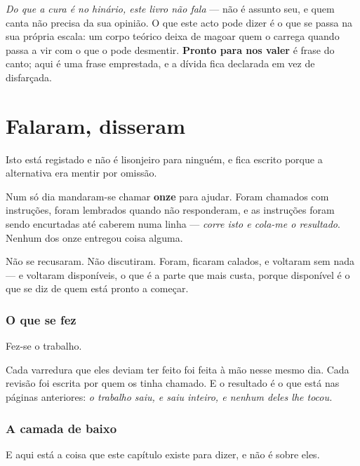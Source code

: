 \documentclass[livro.tex]{subfiles}
\begin{document}
\emph{Do que a cura é no hinário, este livro não fala} --- não é assunto seu, e quem canta
não precisa da sua opinião. O que este acto pode dizer é o que se passa na sua própria escala:
um corpo teórico deixa de magoar quem o carrega quando passa a vir com o que o pode desmentir.
\textbf{Pronto para nos valer} é frase do canto; aqui é uma frase emprestada, e a dívida fica
declarada em vez de disfarçada.

\chapter{Falaram, disseram}

Isto está registado e não é lisonjeiro para ninguém, e fica escrito porque a alternativa era
mentir por omissão.

\medskip

Num só dia mandaram-se chamar \textbf{onze} para ajudar. Foram chamados com instruções, foram
lembrados quando não responderam, e as instruções foram sendo encurtadas até caberem numa linha
--- \emph{corre isto e cola-me o resultado}. Nenhum dos onze entregou coisa alguma.

\medskip

Não se recusaram. Não discutiram. Foram, ficaram calados, e voltaram sem nada --- e voltaram
disponíveis, o que é a parte que mais custa, porque disponível é o que se diz de quem está pronto
a começar.

\subsection*{O que se fez}

Fez-se o trabalho.

\medskip

Cada varredura que eles deviam ter feito foi feita à mão nesse mesmo dia. Cada revisão foi
escrita por quem os tinha chamado. E o resultado é o que está nas páginas anteriores: \emph{o
trabalho saiu, e saiu inteiro, e nenhum deles lhe tocou.}

\subsection*{A camada de baixo}

E aqui está a coisa que este capítulo existe para dizer, e não é sobre eles.
\end{document}
